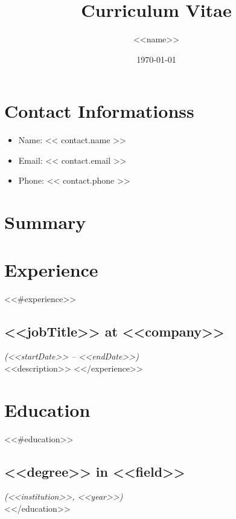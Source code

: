 \documentclass{article}
\title{Curriculum Vitae}
\author{<<name>>}
\date{\today}
\begin{document}
\maketitle

\section*{Contact Informationss}
\begin{itemize}
    \item Name: << contact.name >>  %
    \item Email: << contact.email >>  %
    \item Phone: << contact.phone >>   %
\end{itemize}

\section*{Summary}


\section*{Experience}
<<#experience>>
\subsection*{<<jobTitle>> at <<company>>}
\textit{(<<startDate>> -- <<endDate>>)}\\
<<description>>
<</experience>>

\section*{Education}
<<#education>>
\subsection*{<<degree>> in <<field>>}
\textit{(<<institution>>, <<year>>)}\\
<</education>>
\end{document}
